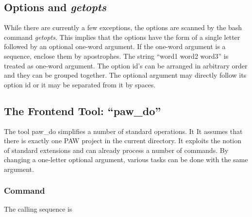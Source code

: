 \documentclass[final,12pt,makeidx,DIV=calc]{article}
\begin{document}
{{{{{{%
\subsection{Options and \textit{getopts}}
While there are currently a few exceptions, the options are scanned by
the bash command \textit{getopts}. This implies that the options have
the form of a single letter followed by an optional one-word
argument. If the one-word argument is a sequence, enclose them by
apostrophes. The string ``word1 word2 word3'' is treated as one-word
argument.  The option id's can be arranged in arbitrary order and they
can be grouped together. The optional argument may directly follow its
option id or it may be separated from it by spaces.

\subsection{The Frontend Tool: ``paw\_do''}
\label{sec:pawshow}
The tool paw\_do simplifies a number of standard operations.  It It
assumes that there is exactly one PAW project in the current
directory.  It exploits the notion of standard extensions and can
already process a number of commands. By changing a one-letter
optional argument, various tasks can be done with the same argument.


\subsubsection{Command}

The calling sequence is

\bigskip{}\bigskip

}}}}}}
\end{document}
